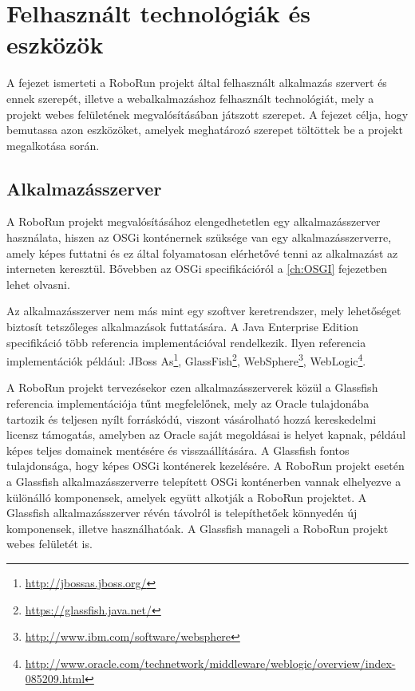 \chapter{Felhasznált technológiák és eszközök}\label{ch:TechnologiakEsEszkozok}

\begin{osszefoglal}
	A fejezet ismerteti a RoboRun projekt által felhasznált alkalmazás szervert és ennek szerepét, illetve a webalkalmazáshoz felhasznált technológiát, mely a projekt webes felületének megvalósításában játszott szerepet. A fejezet célja, hogy bemutassa azon eszközöket, amelyek meghatározó szerepet töltöttek be a projekt megalkotása során.
\end{osszefoglal}


\section{Alkalmazásszerver}\label{sec:Glassfish}
	
	A RoboRun projekt megvalósításához elengedhetetlen egy alkalmazásszerver használata, hiszen az OSGi konténernek szüksége van egy alkalmazásszerverre, amely képes futtatni és ez által folyamatosan elérhetővé tenni az alkalmazást az interneten keresztül. Bővebben az OSGi specifikációról a \ref{ch:OSGI} fejezetben lehet olvasni.
	
	 Az alkalmazásszerver nem más mint egy szoftver keretrendszer, mely lehetőséget biztosít tetszőleges alkalmazások futtatására. A Java Enterprise Edition specifikáció több referencia implementációval rendelkezik. Ilyen referencia implementációk például: JBoss As\footnote{\href {http://jbossas.jboss.org/}{http://jbossas.jboss.org/}}, GlassFish\footnote{\href {https://glassfish.java.net/}{https://glassfish.java.net/}}, WebSphere\footnote{\href {http://www.ibm.com/software/websphere}{http://www.ibm.com/software/websphere}}, WebLogic\footnote{\href {http://www.oracle.com/technetwork/middleware/weblogic/overview/index-085209.html}{http://www.oracle.com/technetwork/middleware/weblogic/overview/index-085209.html}}.
	
	A RoboRun projekt tervezésekor ezen alkalmazásszerverek közül a Glassfish referencia implementációja tűnt megfelelőnek, mely az Oracle tulajdonába tartozik és teljesen nyílt forráskódú, viszont vásárolható hozzá kereskedelmi licensz támogatás, amelyben az Oracle saját megoldásai is helyet kapnak, például képes teljes domainek mentésére és visszaállítására. A Glassfish fontos tulajdonsága, hogy képes OSGi konténerek kezelésére. A RoboRun projekt esetén a Glassfish alkalmazásszerverre telepített OSGi konténerben vannak elhelyezve a különálló komponensek, amelyek együtt alkotják a RoboRun projektet. A Glassfish alkalmazásszerver révén távolról is telepíthetőek könnyedén új komponensek, illetve használhatóak. A Glassfish manageli a RoboRun projekt webes felületét is.


